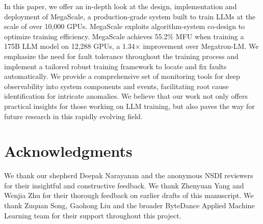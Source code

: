 \documentclass[letterpaper,twocolumn,10pt]{article}
\newcommand{\sysname}{MegaScale\xspace}
\newcommand{\revision}[1]{{#1}}
\begin{document}
In this paper, we offer an in-depth look at the design, implementation and
deployment of \sysname, a production-grade system built to train LLMs at the scale of over 10,000 GPUs. \sysname exploits algorithm-system co-design to optimize training efficiency.
\sysname achieves 55.2\% MFU when training a 175B LLM model on 12,288 GPUs, a 1.34$\times$ improvement over Megatron-LM.
We emphasize the
need for fault tolerance throughout the training process and implement a
tailored robust training framework to locate and fix faults automatically. We
provide a comprehensive set of monitoring tools for deep observability into system
components and events, facilitating root cause identification for intricate
anomalies. We believe that our work not only offers practical insights for those
working on LLM training, but also paves the way for future research in this
rapidly evolving field.

\section*{Acknowledgments}

\revision{We thank our shepherd Deepak Narayanan and the anonymous NSDI
reviewers for their insightful and constructive feedback. We thank Zhenyuan Yang and Wenjia Zhu
for their thorough feedback on earlier drafts of this manuscript. We thank Zuquan
Song, Gaohong Liu and the broader ByteDance Applied Machine Learning team for
their support throughout this project.}
\label{lastpage}

{

}

\clearpage
\end{document}
